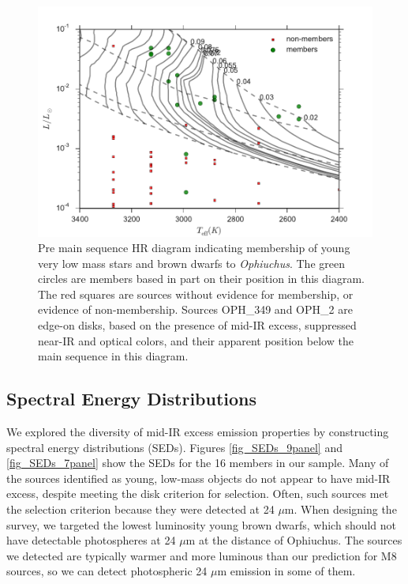 \begin{landscape}
	
\end{landscape}

\begin{landscape}
	
\end{landscape}

\begin{figure}[ht!]
  \caption[Pre main sequence HR diagram with young very low mass stars and brown dwarfs]{Pre main sequence HR diagram indicating membership of young very low mass stars and brown dwarfs to \emph{Ophiuchus}.  The green circles are members based in part on their position in this diagram.  The red squares are sources without evidence for membership, or evidence of non-membership.  Sources OPH\_349 and OPH\_2 are edge-on disks, based on the presence of mid-IR excess, suppressed near-IR and optical colors, and their apparent position below the main sequence in this diagram. \label{fig_HRD_NaI_Ex} }
\centering
\includegraphics[scale=0.6]{chIMACS/figures/HRD_zoom.pdf}
\end{figure}

\subsection{Spectral Energy Distributions}
\label{sec_SED}

We explored the diversity of mid-IR excess emission properties by constructing spectral energy distributions (SEDs).  Figures \ref{fig_SEDs_9panel} and \ref{fig_SEDs_7panel} show the SEDs for the 16 members in our sample.  Many of the sources identified as young, low-mass objects do not appear to have mid-IR excess, despite meeting the disk criterion for selection.  Often, such sources met the selection criterion because they were detected at 24 $\mu$m.  When designing the survey, we targeted the lowest luminosity young brown dwarfs, which should not have detectable photospheres at 24 $\mu$m at the distance of Ophiuchus.  The sources we detected are typically warmer and more luminous than our prediction for M8 sources, so we can detect photospheric 24 $\mu$m emission in some of them.

